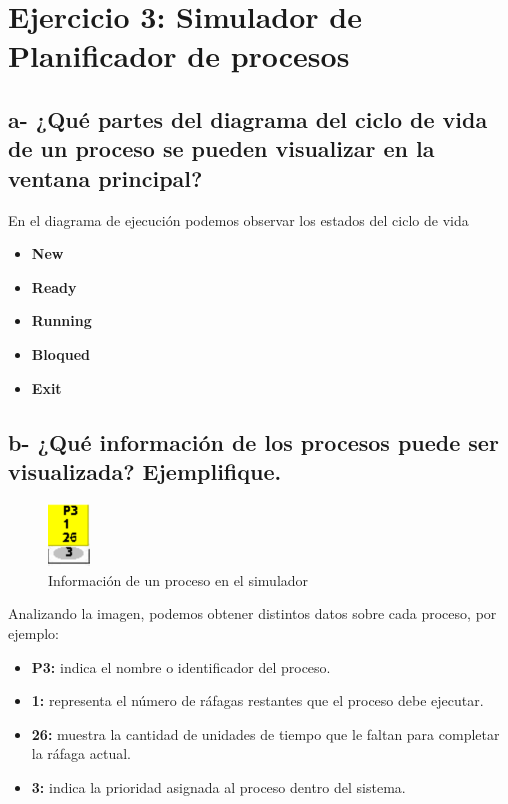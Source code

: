 \documentclass{article}
\begin{document}

\section*{Ejercicio 3: Simulador de Planificador de procesos}

\subsection*{a- ¿Qué partes del diagrama del ciclo de vida de un proceso se pueden visualizar en la ventana
principal?}

\noindent
En el diagrama de ejecución podemos observar los estados del ciclo de vida

\begin{itemize}
  \item \textbf{New}
  \item \textbf{Ready}
  \item \textbf{Running}
  \item \textbf{Bloqued}
  \item \textbf{Exit}
\end{itemize}

\subsection*{b- ¿Qué información de los procesos puede ser visualizada? Ejemplifique.}
\begin{figure}[h]
  \centering
  \includegraphics[width=0.1\textwidth]{resources/3b.png}
  \caption{Información de un proceso en el simulador}
\end{figure}

\noindent
Analizando la imagen, podemos obtener distintos datos sobre cada proceso, por ejemplo:

\begin{itemize}
  \item \textbf{P3:} indica el nombre o identificador del proceso.
  \item \textbf{1:} representa el número de ráfagas restantes que el proceso debe ejecutar.
  \item \textbf{26:} muestra la cantidad de unidades de tiempo que le faltan para completar la ráfaga actual.
  \item \textbf{3:} indica la prioridad asignada al proceso dentro del sistema.
\end{itemize}
\end{document}

